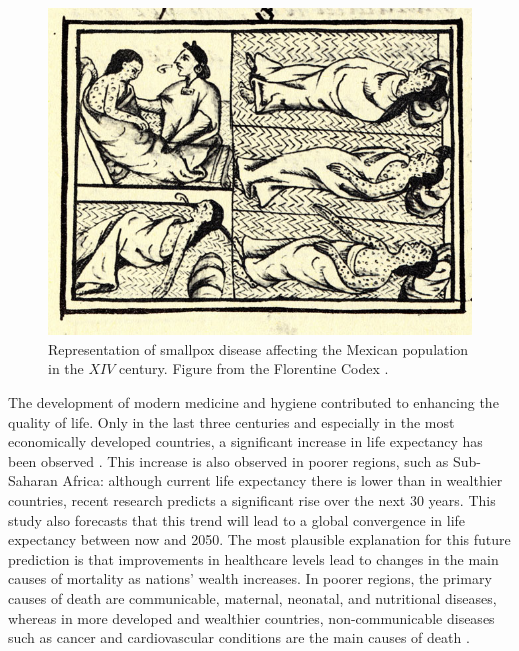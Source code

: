 \begin{figure}[ht]
	\centering
	\includegraphics[width=0.43\linewidth]{0_introduction/images_introduction/FlorentineCodex_smallpox}
	\caption[Smallpox on native Americans]{Representation of smallpox disease affecting the Mexican population in the $XIV$ century. Figure from the Florentine Codex \cite{Sahagun1965}. }
	\label{fig:florentinecodexsmallpox}
\end{figure}

The development of modern medicine and hygiene contributed to enhancing the quality of life. Only in the last three centuries and especially in the most economically developed countries, a significant increase in life expectancy has been observed \cite{Anderson_82}.
This increase is also observed in poorer regions, such as Sub-Saharan Africa: although current life expectancy there is lower than in wealthier countries, recent research \cite{Vollset_2024} predicts a significant rise over the next 30 years. This study also forecasts that this trend will lead to a global convergence in life expectancy between now and 2050.
The most plausible explanation for this future prediction is that improvements in healthcare levels lead to changes in the main causes of mortality as nations' wealth increases. In poorer regions, the primary causes of death are communicable, maternal, neonatal, and nutritional diseases, whereas in more developed and wealthier countries, non-communicable diseases such as cancer and cardiovascular conditions are the main causes of death \cite{eurostat}.

